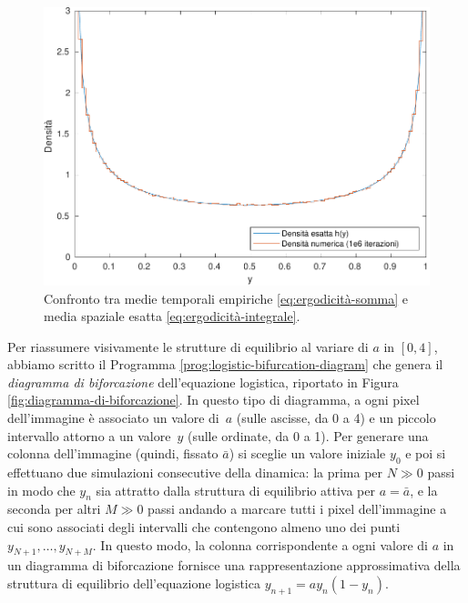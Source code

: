 \begin{figure}[tbp]
\centering
\includegraphics[height=0.4\textheight]{logistic-ergodicity.pdf}
\caption{Confronto tra medie temporali empiriche \eqref{eq:ergodicità-somma}
e media spaziale esatta \eqref{eq:ergodicità-integrale}.}
\label{fig:logistic-ergodicity}
\end{figure}

Per riassumere visivamente le strutture di equilibrio al variare di $a$ in $[0,4]$,
abbiamo scritto il Programma \ref{prog:logistic-bifurcation-diagram} che genera
il \emph{diagramma di biforcazione} dell'equazione logistica,
riportato in Figura \ref{fig:diagramma-di-biforcazione}.
In questo tipo di diagramma, a ogni pixel dell'immagine è associato un
valore di~$a$ (sulle ascisse, da 0 a 4) e un piccolo intervallo attorno
a un valore~$y$ (sulle ordinate, da 0 a 1).
Per generare una colonna dell'immagine (quindi, fissato $\bar{a}$) si sceglie
un valore iniziale $y_0$ e poi si effettuano due simulazioni consecutive
della dinamica: la prima per $N \gg 0$ passi in modo che $y_n$ sia attratto
dalla struttura di equilibrio attiva per $a = \bar{a}$, e la seconda per
altri $M \gg 0$ passi andando a marcare tutti i pixel dell'immagine a cui sono associati
degli intervalli che contengono almeno uno dei punti $y_{N+1},\dots,y_{N+M}$.
In questo modo, la colonna corrispondente a ogni valore di $a$ in un diagramma
di biforcazione fornisce una rappresentazione approssimativa della
struttura di equilibrio dell'equazione logistica $y_{n+1} = a y_n (1-y_n)$.



